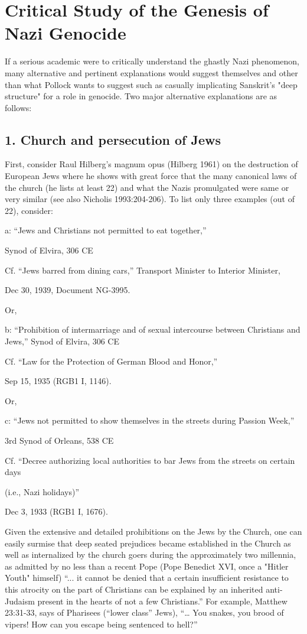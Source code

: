 \section*{Critical Study of the Genesis of Nazi Genocide}

If a serious academic were to critically understand the ghastly Nazi phenomenon, many alternative and pertinent explanations would suggest themselves and other than what Pollock wants to suggest such as casually implicating Sanskrit's "deep structure" for a role in genocide. Two major alternative explanations are as follows:

\subsection*{1. Church and persecution of Jews}
First, consider Raul Hilberg's magnum opus (Hilberg 1961) on the destruction of European Jews where he shows with great force that the many canonical laws of the church (he lists at least 22) and what the Nazis promulgated were same or very similar (see also Nicholis 1993:204-206). To list only three examples (out of 22), consider:

a: “Jews and Christians not permitted to eat together,”

Synod of Elvira, 306 CE

Cf. “Jews barred from dining cars,” Transport Minister to Interior Minister, 

Dec 30, 1939, Document NG-3995. 
\medskip

Or, 

b: “Prohibition of intermarriage and of sexual intercourse between Christians and Jews,” Synod of Elvira, 306 CE 

Cf. “Law for the Protection of German Blood and Honor,” 

Sep 15, 1935 (RGB1 I, 1146).
\medskip

Or,

c: “Jews not permitted to show themselves in the streets during Passion Week,” 

3rd  Synod of Orleans, 538 CE 

Cf. “Decree authorizing local authorities to bar Jews from the streets on certain days

(i.e., Nazi holidays)” 

Dec 3, 1933 (RGB1 I, 1676).

Given the extensive and detailed prohibitions on the Jews by the Church, one can easily surmise that deep seated prejudices became established in the Church as well as internalized by the church goers during the approximately two millennia, as admitted by no less than a recent Pope (Pope Benedict XVI, once a "Hitler Youth" himself) “... it cannot be denied that a certain insufficient resistance to this atrocity on the part of Christians can be explained by an inherited anti-Judaism present in the hearts of not a few Christians.” For example, Matthew 23:31-33, says of Pharisees (“lower class” Jews), “… You snakes, you brood of vipers! How can you escape being sentenced to hell?”

